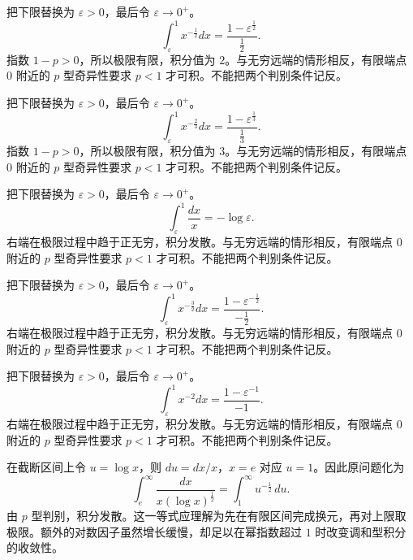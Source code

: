 \documentclass[UTF8,12pt,a4paper,fontset=fandol]{ctexart}
\begin{document}
\begin{solve}\label{ans:c19q9}
把下限替换为 $\varepsilon>0$，最后令 $\varepsilon\to0^+$。
\[
\int_\varepsilon^1x^{-\frac{1}{2}}dx=\frac{1-\varepsilon^{\frac{1}{2}}}{\frac{1}{2}}.
\]
指数 $1-p>0$，所以极限有限，积分值为 $2$。与无穷远端的情形相反，有限端点 $0$ 附近的 $p$ 型奇异性要求 $p<1$ 才可积。不能把两个判别条件记反。
\end{solve}

\begin{solve}\label{ans:c19q10}
把下限替换为 $\varepsilon>0$，最后令 $\varepsilon\to0^+$。
\[
\int_\varepsilon^1x^{-\frac{2}{3}}dx=\frac{1-\varepsilon^{\frac{1}{3}}}{\frac{1}{3}}.
\]
指数 $1-p>0$，所以极限有限，积分值为 $3$。与无穷远端的情形相反，有限端点 $0$ 附近的 $p$ 型奇异性要求 $p<1$ 才可积。不能把两个判别条件记反。
\end{solve}

\begin{solve}\label{ans:c19q11}
把下限替换为 $\varepsilon>0$，最后令 $\varepsilon\to0^+$。
\[
\int_\varepsilon^1\frac{dx}{x}=-\log\varepsilon.
\]
右端在极限过程中趋于正无穷，积分发散。与无穷远端的情形相反，有限端点 $0$ 附近的 $p$ 型奇异性要求 $p<1$ 才可积。不能把两个判别条件记反。
\end{solve}

\begin{solve}\label{ans:c19q12}
把下限替换为 $\varepsilon>0$，最后令 $\varepsilon\to0^+$。
\[
\int_\varepsilon^1x^{-\frac{3}{2}}dx=\frac{1-\varepsilon^{-\frac{1}{2}}}{-\frac{1}{2}}.
\]
右端在极限过程中趋于正无穷，积分发散。与无穷远端的情形相反，有限端点 $0$ 附近的 $p$ 型奇异性要求 $p<1$ 才可积。不能把两个判别条件记反。
\end{solve}

\begin{solve}\label{ans:c19q13}
把下限替换为 $\varepsilon>0$，最后令 $\varepsilon\to0^+$。
\[
\int_\varepsilon^1x^{-2}dx=\frac{1-\varepsilon^{-1}}{-1}.
\]
右端在极限过程中趋于正无穷，积分发散。与无穷远端的情形相反，有限端点 $0$ 附近的 $p$ 型奇异性要求 $p<1$ 才可积。不能把两个判别条件记反。
\end{solve}

\begin{solve}\label{ans:c19q14}
在截断区间上令 $u=\log x$，则 $du=dx/x$，$x=e$ 对应 $u=1$。因此原问题化为
\[
\int_e^\infty\frac{dx}{x(\log x)^{\frac{1}{2}}}=\int_1^\infty u^{-\frac{1}{2}}\,du.
\]
由 $p$ 型判别，积分发散。这一等式应理解为先在有限区间完成换元，再对上限取极限。额外的对数因子虽然增长缓慢，却足以在幂指数超过 $1$ 时改变调和型积分的收敛性。
\end{solve}
\end{document}
